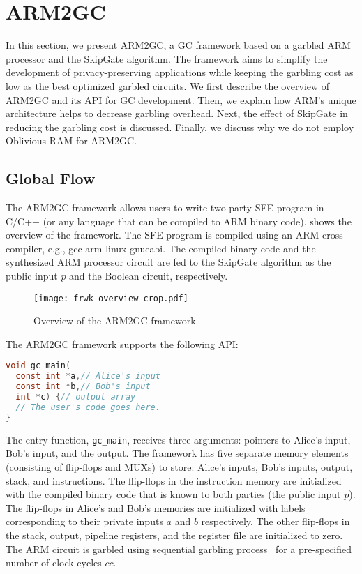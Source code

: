 \section{ARM2GC}
In this section, we present ARM2GC, a GC framework based on a garbled ARM processor and the SkipGate algorithm.
The framework aims to simplify the development of privacy-preserving applications while keeping the garbling cost as low as the best optimized garbled circuits.
We first describe the overview of ARM2GC and its API for GC development.
Then, we explain how ARM's unique architecture helps to decrease garbling overhead.
Next, the effect of SkipGate in reducing the garbling cost is discussed.
Finally, we discuss why we do not employ Oblivious RAM for ARM2GC.

\subsection{Global Flow}\label{ssec:arm-global}
The ARM2GC framework allows users to write two-party SFE program in C/C++ (or any language that can be compiled to ARM binary code).
 shows the overview of the framework.
The SFE program is compiled using an ARM cross-compiler, e.g., gcc-arm-linux-gnueabi.
The compiled binary code and the synthesized ARM processor circuit are fed to the SkipGate algorithm as the public input $p$ and the Boolean circuit, respectively.

\begin{figure}[ht]
\centering
\texttt{[image: frwk\_overview-crop.pdf]}
\caption{Overview of the ARM2GC framework.}\label{fig:frwk_overview}
\end{figure}

The ARM2GC framework supports the following API:
\begin{lstlisting}[language=C,basicstyle=\ttfamily,keywordstyle=\color{blue}\ttfamily,stringstyle=\color{red}\ttfamily,commentstyle=\color{CommentColor}\ttfamily]
void gc_main(
  const int *a,// Alice's input
  const int *b,// Bob's input
  int *c) {// output array
  // The user's code goes here.
}
\end{lstlisting}

The entry function, \texttt{gc\_main}, receives three arguments: pointers to Alice's input, Bob's input, and the output.
The framework has five separate memory elements (consisting of flip-flops and MUXs) to store: Alice's inputs, Bob's inputs, output, stack, and instructions.
The flip-flops in the instruction memory are initialized with the compiled binary code that is known to both parties (the public input $p$).
The flip-flops in Alice's and Bob's memories are initialized with labels corresponding to their private inputs $a$ and $b$ respectively.
The other flip-flops in the stack, output, pipeline registers, and the register file are initialized to zero.
The ARM circuit is garbled using sequential garbling process~\cite{songhori2015tinygarble} for a pre-specified number of clock cycles $cc$.

